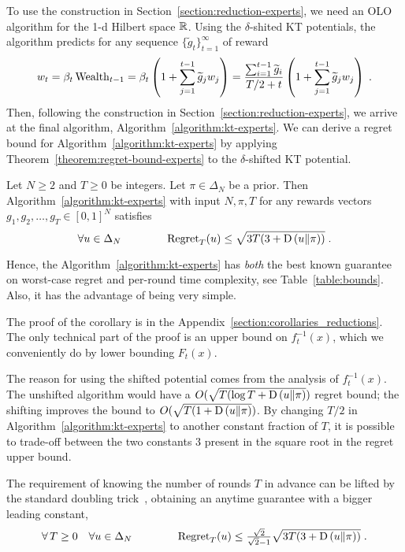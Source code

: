 To use the construction in Section~\ref{section:reduction-experts}, we need an
OLO algorithm for the 1-d Hilbert space $\mathbb{R}$.  Using the $\delta$-shited KT
potentials, the algorithm predicts for any sequence $\{\widetilde
g_t\}_{t=1}^\infty$ of reward
\[
w_t
= \beta_t \operatorname{Wealth}_{t-1}
= \beta_t \left(1 + \sum_{j=1}^{t-1} \widetilde g_j w_j \right)
= \frac{\sum_{i=1}^{t-1} \widetilde g_i}{T/2+t} \left(1 + \sum_{j=1}^{t-1} \widetilde g_j w_j \right) \; .
\]
Then, following the construction in Section~\ref{section:reduction-experts}, we
arrive at the final algorithm, Algorithm~\ref{algorithm:kt-experts}.
We can derive a regret bound for Algorithm~\ref{algorithm:kt-experts} by
applying Theorem~\ref{theorem:regret-bound-experts} to the $\delta$-shifted KT
potential.
%
\begin{corollary} \label{corollary:kt-experts-regret} Let
$N \ge 2$ and $T \ge 0$ be integers. Let $\pi \in \Delta_N$ be a prior.
Then Algorithm~\ref{algorithm:kt-experts} with input $N,\pi,T$
for any rewards vectors $g_1, g_2, \dots, g_T \in [0,1]^N$ satisfies
\[
\forall u \in \Delta_N \qquad \qquad \operatorname{Regret}_T(u) \le \sqrt{3T (3 + \operatorname{D}\left({u}\middle\|{\pi}\right))} \; .
\]
\end{corollary}
%
Hence, the Algorithm~\ref{algorithm:kt-experts} has \emph{both} the best known
guarantee on worst-case regret and per-round time complexity, see
Table~\ref{table:bounds}. Also, it has the advantage of being very simple.

The proof of the corollary is in the
Appendix~\ref{section:corollaries_reductions}.  The only technical part of the proof
is an upper bound on $f_t^{-1}(x)$, which we conveniently do by lower bounding
$F_t(x)$.

The reason for using the shifted potential comes from the analysis of
$f_t^{-1}(x)$. The unshifted algorithm would have a $O(\sqrt{T (\log T +
\operatorname{D}\left({u}\middle\|{\pi}\right)})$ regret bound; the shifting improves the bound to $O(\sqrt{T (1 +
\operatorname{D}\left({u}\middle\|{\pi}\right)})$.  By changing $T/2$ in Algorithm~\ref{algorithm:kt-experts} to
another constant fraction of $T$, it is possible to trade-off between the two
constants $3$ present in the square root in the regret upper bound.

The requirement of knowing the number of rounds $T$ in advance can be lifted by
the standard doubling trick~\cite[Section 2.3.1]{Shalev-Shwartz-2011},
obtaining an anytime guarantee with a bigger leading constant,
\[
\forall \, T \ge 0 \quad \forall u \in \Delta_N \qquad \qquad
\operatorname{Regret}_T(u) \le \tfrac{\sqrt{2}}{\sqrt{2} - 1} \sqrt{3T (3 + \operatorname{D}\left({u}\middle\|{\pi}\right))} \; .
\]
